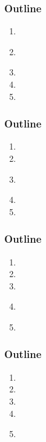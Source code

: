 \documentclass[usenames,dvipsnames]{beamer}
\begin{document}
\miniframesoff
  \begin{frame}
    \frametitle{\textbf{Outline}}
  \begin{enumerate}
    \item \introtitle
    \item \textbf{\firsttitle}
    \item \secondtitle
    \item \thirdtitle
    \item \conclusiontitle
  \end{enumerate}
  \end{frame}
\miniframeson



\miniframesoff
  \begin{frame}
    \frametitle{\textbf{Outline}}
  \begin{enumerate}
    \item \introtitle
    \item \firsttitle
    \item \textbf{\secondtitle}
    \item \thirdtitle
    \item \conclusiontitle
  \end{enumerate}
  \end{frame}
\miniframeson



\miniframesoff
  \begin{frame}
    \frametitle{\textbf{Outline}}
  \begin{enumerate}
    \item \introtitle
    \item \firsttitle
    \item \secondtitle
    \item \textbf{\thirdtitle}
    \item \conclusiontitle
  \end{enumerate}
  \end{frame}
\miniframeson


  
\miniframesoff
  \begin{frame}
    \frametitle{\textbf{Outline}}
  \begin{enumerate}
    \item \introtitle
    \item \firsttitle
    \item \secondtitle
    \item \thirdtitle
    \item \textbf{\conclusiontitle}
  \end{enumerate}
  \end{frame}
\miniframeson
\end{document}
